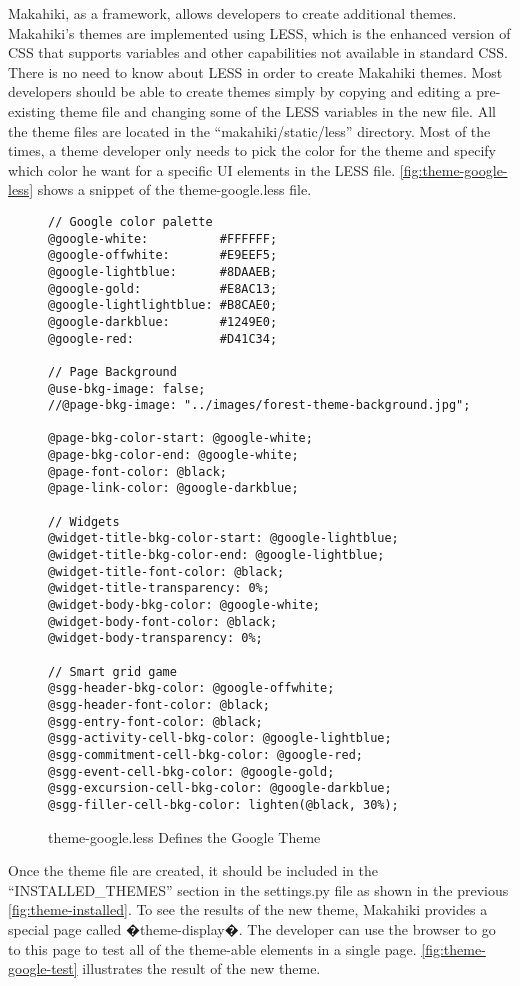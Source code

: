 Makahiki, as a framework, allows developers to create additional themes. Makahiki's themes are implemented using LESS, which is the  enhanced version of CSS that supports variables and other capabilities not available in standard CSS. There is no need to know about LESS in order to create Makahiki themes. Most developers should be able to create themes simply by copying and editing a pre-existing theme file and changing some of the LESS variables in the new file. All the theme files are located in the ``makahiki/static/less'' directory.  Most of the times, a theme developer only needs to pick the color for the theme and specify which color he want for a specific UI elements in the LESS file. \autoref{fig:theme-google-less} shows a snippet of the theme-google.less file.

\begin{figure}[!ht]
\begin{lstlisting}
// Google color palette
@google-white:          #FFFFFF;
@google-offwhite:       #E9EEF5;
@google-lightblue:      #8DAAEB;
@google-gold:           #E8AC13;
@google-lightlightblue: #B8CAE0;
@google-darkblue:       #1249E0;
@google-red:            #D41C34;

// Page Background
@use-bkg-image: false;
//@page-bkg-image: "../images/forest-theme-background.jpg";

@page-bkg-color-start: @google-white;
@page-bkg-color-end: @google-white;
@page-font-color: @black;
@page-link-color: @google-darkblue;

// Widgets
@widget-title-bkg-color-start: @google-lightblue;
@widget-title-bkg-color-end: @google-lightblue;
@widget-title-font-color: @black;
@widget-title-transparency: 0%;
@widget-body-bkg-color: @google-white;
@widget-body-font-color: @black;
@widget-body-transparency: 0%;

// Smart grid game
@sgg-header-bkg-color: @google-offwhite;
@sgg-header-font-color: @black;
@sgg-entry-font-color: @black;
@sgg-activity-cell-bkg-color: @google-lightblue;
@sgg-commitment-cell-bkg-color: @google-red;
@sgg-event-cell-bkg-color: @google-gold;
@sgg-excursion-cell-bkg-color: @google-darkblue;
@sgg-filler-cell-bkg-color: lighten(@black, 30%);

\end{lstlisting}
\caption{theme-google.less Defines the Google Theme}
\label{fig:theme-google-less}
\end{figure}

Once the theme file are created, it should be included in the ``INSTALLED\_THEMES'' section in the settings.py file as shown in the previous \autoref{fig:theme-installed}. To see the results of the new theme, Makahiki provides a special page called �theme-display�. The developer can use the browser to go to this page to test all of the theme-able elements in a single page. \autoref{fig:theme-google-test} illustrates the result of the new theme.

